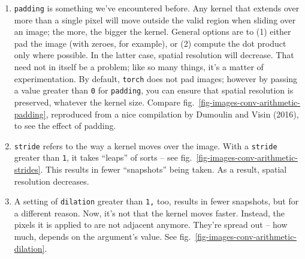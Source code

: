 \documentclass[
  letterpaper,
]{krantz}
\begin{document}
\begin{enumerate}
\def\labelenumi{\arabic{enumi}.}
\item
  \texttt{padding} is something we've encountered before.
  Any kernel that extends over more than a single pixel will move
  outside the valid region when sliding over an image; the more, the
  bigger the kernel. General options are to (1) either pad the image
  (with zeroes, for example), or (2) compute the dot product only where
  possible. In the latter case, spatial resolution will decrease. That
  need not in itself be a problem; like so many things, it's a matter of
  experimentation. By default, \texttt{torch} does not pad images;
  however by passing a value greater than \texttt{0} for
  \texttt{padding}, you can ensure that spatial resolution is preserved,
  whatever the kernel size. Compare
  fig.~\ref{fig-images-conv-arithmetic-padding}, reproduced from a nice
  compilation by Dumoulin and Visin (2016), to see the effect of
  padding.
\item
  \texttt{stride} refers to the way a kernel moves over
  the image. With a \texttt{stride} greater than \texttt{1}, it takes
  ``leaps'' of sorts -- see
  fig.~\ref{fig-images-conv-arithmetic-strides}. This results in fewer
  ``snapshots'' being taken. As a result, spatial resolution decreases.
\item
  A setting of \texttt{dilation} greater than
  \texttt{1,} too, results in fewer snapshots, but for a different
  reason. Now, it's not that the kernel moves faster. Instead, the
  pixels it is applied to are not adjacent anymore. They're spread out
  -- how much, depends on the argument's value. See
  fig.~\ref{fig-images-conv-arithmetic-dilation}.
\end{enumerate}
\end{document}
